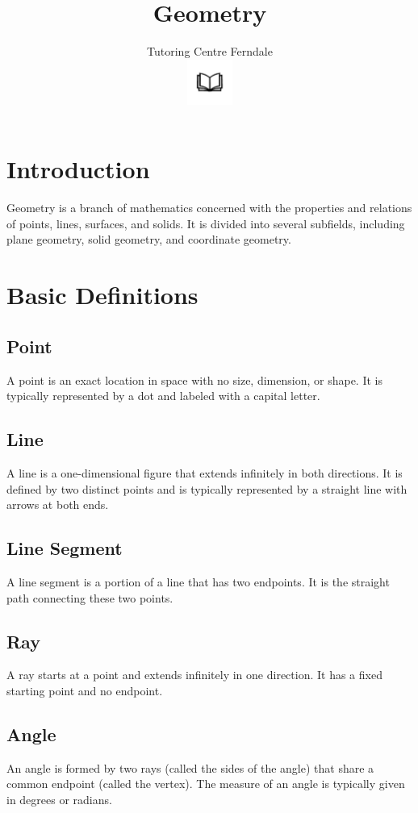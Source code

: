 \documentclass[12pt]{article}
\title{\textbf{Geometry}}\\
\author{Tutoring Centre Ferndale\\
\includegraphics[width=4em]{ApS_logo.png}}
\date{}
\begin{document}
\maketitle

\section*{Introduction}
Geometry is a branch of mathematics concerned with the properties and relations of points, lines, surfaces, and solids. It is divided into several subfields, including plane geometry, solid geometry, and coordinate geometry.

\section*{Basic Definitions}

\subsection*{Point}
A point is an exact location in space with no size, dimension, or shape. It is typically represented by a dot and labeled with a capital letter.

\subsection*{Line}
A line is a one-dimensional figure that extends infinitely in both directions. It is defined by two distinct points and is typically represented by a straight line with arrows at both ends.

\subsection*{Line Segment}
A line segment is a portion of a line that has two endpoints. It is the straight path connecting these two points.

\subsection*{Ray}
A ray starts at a point and extends infinitely in one direction. It has a fixed starting point and no endpoint.

\subsection*{Angle}
An angle is formed by two rays (called the sides of the angle) that share a common endpoint (called the vertex). The measure of an angle is typically given in degrees or radians.
\end{document}
